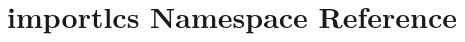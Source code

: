 \hypertarget{namespaceimportlcs}{\section{importlcs Namespace Reference}
\label{namespaceimportlcs}
}
